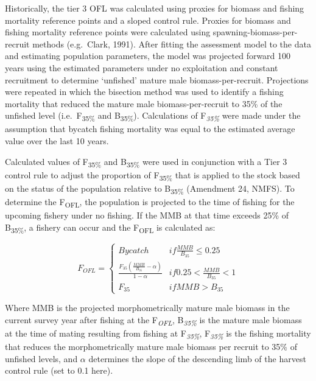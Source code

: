 \documentclass[
]{article}
\begin{document}
Historically, the tier 3 OFL was calculated using proxies for biomass and fishing mortality reference points and a sloped control rule. Proxies for biomass and fishing mortality reference points were calculated using spawning-biomass-per-recruit methods (e.g.~Clark, 1991). After fitting the assessment model to the data and estimating population parameters, the model was projected forward 100 years using the estimated parameters under no exploitation and constant recruitment to determine `unfished' mature male biomass-per-recruit. Projections were repeated in which the bisection method was used to identify a fishing mortality that reduced the mature male biomass-per-recruit to 35\% of the unfished level (i.e.~F\textsubscript{35\%} and B\textsubscript{35\%}). Calculations of F\textsubscript{\emph{35\%}} were made under the assumption that bycatch fishing mortality was equal to the estimated average value over the last 10 years.

Calculated values of F\textsubscript{35\%} and B\textsubscript{35\%} were used in conjunction with a Tier 3 control rule to adjust the proportion of F\textsubscript{35\%} that is applied to the stock based on the status of the population relative to B\textsubscript{35\%} (Amendment 24, NMFS). To determine the F\textsubscript{OFL}, the population is projected to the time of fishing for the upcoming fishery under no fishing. If the MMB at that time exceeds 25\% of B\textsubscript{35\%}, a fishery can occur and the F\textsubscript{OFL} is calculated as:

\[\begin{equation}
F_{OFL} =
\begin{cases}
Bycatch  & if \frac{MMB}{B_{35}} \leq 0.25 \\[3ex]
\frac {F_{35} ( \frac {MMB}{B_{35}} - \alpha)}{1-\alpha}  & if 0.25 < \frac {MMB}{B_{35}} < 1 \\[3ex]
F_{35} & if MMB > B_{35}
\end{cases}
\end{equation}\]

Where MMB is the projected morphometrically mature male biomass in the current survey year after fishing at the F\textsubscript{\emph{OFL}}, B\textsubscript{\emph{35\%}} is the mature male biomass at the time of mating resulting from fishing at F\textsubscript{\emph{35\%}}, F\textsubscript{\emph{35\%}} is the fishing mortality that reduces the morphometrically mature male biomass per recruit to 35\% of unfished levels, and \(\alpha\) determines the slope of the descending limb of the harvest control rule (set to 0.1 here).
\end{document}
